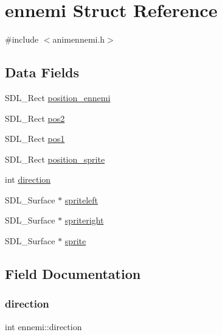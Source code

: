 \hypertarget{structennemi}{}\section{ennemi Struct Reference}
\label{structennemi}


{\ttfamily \#include $<$animennemi.\+h$>$}

\subsection*{Data Fields}
\begin{DoxyCompactItemize}
\item 
S\+D\+L\+\_\+\+Rect \hyperlink{structennemi_ab236808a3af75588847442504250d02f}{position\+\_\+ennemi}
\item 
S\+D\+L\+\_\+\+Rect \hyperlink{structennemi_a1fca83eeee08fde8a80a8b9c0a0ae00f}{pos2}
\item 
S\+D\+L\+\_\+\+Rect \hyperlink{structennemi_a04c7d21c26dd2fd99eceecd6059bff90}{pos1}
\item 
S\+D\+L\+\_\+\+Rect \hyperlink{structennemi_abc473e1ffbf2e5848151d900724e3f83}{position\+\_\+sprite}
\item 
int \hyperlink{structennemi_aa1f57a616910ffd5799f1097a3160e0b}{direction}
\item 
S\+D\+L\+\_\+\+Surface $\ast$ \hyperlink{structennemi_a4f333ffffb5036c74a62a60437d60422}{spriteleft}
\item 
S\+D\+L\+\_\+\+Surface $\ast$ \hyperlink{structennemi_a8ad9de831604958b2654c033280129f1}{spriteright}
\item 
S\+D\+L\+\_\+\+Surface $\ast$ \hyperlink{structennemi_a8e471648b06ba4ca284cf8f3627eb0cc}{sprite}
\end{DoxyCompactItemize}


\subsection{Field Documentation}
\mbox{\label{structennemi_aa1f57a616910ffd5799f1097a3160e0b}} 
\subsubsection{\texorpdfstring{direction}{direction}}
{\footnotesize\ttfamily int ennemi\+::direction}

\mbox{\label{structennemi_a04c7d21c26dd2fd99eceecd6059bff90}} 
